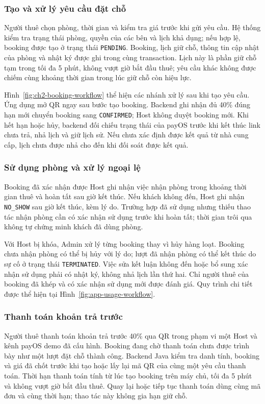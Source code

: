 \subsubsection{Tạo và xử lý yêu cầu đặt chỗ}
Người thuê chọn phòng, thời gian và kiểm tra giá trước khi gửi yêu cầu. Hệ thống kiểm tra trạng thái phòng, quyền của các bên và lịch khả dụng; nếu hợp lệ, booking được tạo ở trạng thái \texttt{PENDING}. Booking, lịch giữ chỗ, thông tin cập nhật của phòng và nhật ký được ghi trong cùng transaction. Lịch này là phần giữ chỗ tạm trong tối đa 5 phút, không vượt giờ bắt đầu thuê; yêu cầu khác không được chiếm cùng khoảng thời gian trong lúc giữ chỗ còn hiệu lực.

Hình~\ref{fig:ch2-booking-workflow} thể hiện các nhánh xử lý sau khi tạo yêu cầu. Ứng dụng mở QR ngay sau bước tạo booking. Backend ghi nhận đủ 40\% đúng hạn mới chuyển booking sang \texttt{CONFIRMED}; Host không duyệt booking mới. Khi hết hạn hoặc hủy, backend đối chiếu trạng thái của payOS trước khi kết thúc link chưa trả, nhả lịch và giữ lịch sử. Nếu chưa xác định được kết quả từ nhà cung cấp, lịch chưa được nhả cho đến khi đối soát được kết quả.

\subsubsection{Sử dụng phòng và xử lý ngoại lệ}
Booking đã xác nhận được Host ghi nhận việc nhận phòng trong khoảng thời gian thuê và hoàn tất sau giờ kết thúc. Nếu khách không đến, Host ghi nhận \texttt{NO\_SHOW} sau giờ kết thúc, kèm lý do. Trường hợp đã sử dụng nhưng thiếu thao tác nhận phòng cần có xác nhận sử dụng trước khi hoàn tất; thời gian trôi qua không tự chứng minh khách đã dùng phòng.

Với Host bị khóa, Admin xử lý từng booking thay vì hủy hàng loạt. Booking chưa nhận phòng có thể bị hủy với lý do; lượt đã nhận phòng có thể kết thúc do sự cố ở trạng thái \texttt{TERMINATED}. Việc sửa kết luận không đến hoặc bổ sung xác nhận sử dụng phải có nhật ký, không nhả lịch lần thứ hai. Chỉ người thuê của booking đã khép và có xác nhận sử dụng mới được đánh giá. Quy trình chi tiết được thể hiện tại Hình~\ref{fig:app-usage-workflow}.

\subsubsection{Thanh toán khoản trả trước}
Người thuê thanh toán khoản trả trước 40\% qua QR trong phạm vi một Host và kênh payOS demo đã cấu hình. Booking đang chờ thanh toán chưa được trình bày như một lượt đặt chỗ thành công. Backend Java kiểm tra danh tính, booking và giá đã chốt trước khi tạo hoặc lấy lại mã QR của cùng một yêu cầu thanh toán. Thời hạn thanh toán tính từ lúc tạo booking trên máy chủ, tối đa 5 phút và không vượt giờ bắt đầu thuê. Quay lại hoặc tiếp tục thanh toán dùng cùng mã đơn và cùng thời hạn; thao tác này không gia hạn giữ chỗ.

